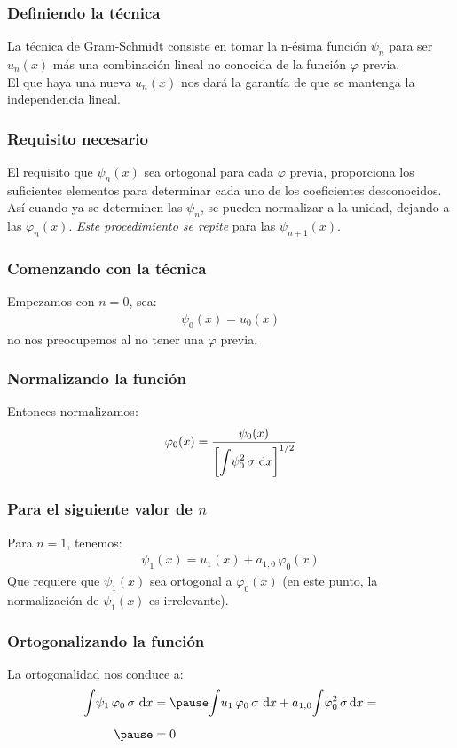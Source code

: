 \documentclass[12pt]{beamer}
\begin{document}
\begin{frame}
\frametitle{Definiendo la técnica}
La técnica de Gram-Schmidt consiste en tomar la n-ésima función $\psi_{n}$ para ser $u_{n}(x)$ más una combinación lineal no conocida de la función $\varphi$ previa.
\\
\bigskip
\pause
El que haya una nueva $u_{n}(x)$ nos dará la garantía de que se mantenga la independencia lineal.
\end{frame}
\begin{frame}
\frametitle{Requisito necesario}
El requisito que $\psi_{n}(x)$ sea ortogonal para cada $\varphi$ previa, proporciona los suficientes elementos para determinar cada uno de los coeficientes desconocidos.
\\
\bigskip
\pause
Así cuando ya se determinen las $\psi_{n}$, se pueden normalizar a la unidad, dejando a las  $\varphi_{n} (x)$. \pause \emph{Este procedimiento se repite} para las $\psi_{n+1}(x)$.
\end{frame}
\begin{frame}
\frametitle{Comenzando con la técnica}
Empezamos con $n = 0$, sea:
\pause
\begin{align}
\psi_{0} (x) = u_{0} (x)
\label{eq:ecuacion_10_41}
\end{align}
\pause
no nos preocupemos al no tener una $\varphi$ previa.
\end{frame}
\begin{frame}
\frametitle{Normalizando la función}
Entonces normalizamos:
\pause
\begin{align}
\varphi_{0}(x) = \dfrac{\psi_{0} (x)}{\left[ \displaystyle \scaleint{5ex} \psi_{0}^{2} \, \sigma \, \dd{x} \right]^{1/2}}
\label{eq:ecuacion_10_42}
\end{align}
\end{frame}
\begin{frame}
\frametitle{Para el siguiente valor de $n$}
Para $n = 1$, tenemos:
\pause
\begin{align}
\psi_{1} (x) = u_{1} (x) + a_{1, 0} \, \varphi_{0} (x)
\label{eq:ecuacion_10_43}
\end{align}
\pause
Que requiere que $\psi_{1} (x)$ sea ortogonal a $\varphi_{0} (x)$ (en este punto, la normalización de $\psi_{1} (x)$ es irrelevante).
\end{frame}
\begin{frame}
\frametitle{Ortogonalizando la función}
La ortogonalidad nos conduce a:
\pause
\begin{eqnarray}
\begin{aligned}[b]
\scaleint{5ex} \psi_{1} \, \varphi_{0} \, \sigma \, \dd{x} &= \pause \scaleint{5ex} u_{1} \, \varphi_{0} \, \sigma \, \dd{x} + a_{1,0} \scaleint{5ex} \varphi_{0}^{2} \, \sigma \dd{x} = \\[0.5em] \pause
&= 0
\end{aligned}
\label{eq:ecuacion_10_44}
\end{eqnarray}
\end{frame}
\end{document}
